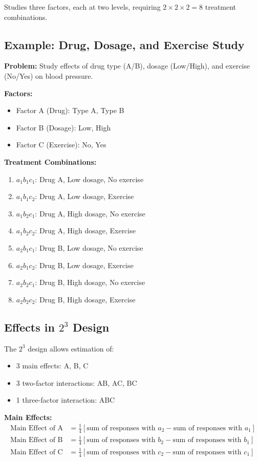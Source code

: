 \documentclass[twoside]{book}
\begin{document}
Studies three factors, each at two levels, requiring $2 \times 2 \times 2 = 8$ treatment combinations.

\subsection{Example: Drug, Dosage, and Exercise Study}

\textbf{Problem:} Study effects of drug type (A/B), dosage (Low/High), and exercise (No/Yes) on blood pressure.

\textbf{Factors:}
\begin{itemize}
    \item Factor A (Drug): Type A, Type B
    \item Factor B (Dosage): Low, High
    \item Factor C (Exercise): No, Yes
\end{itemize}

\textbf{Treatment Combinations:}
\begin{enumerate}
    \item $a_1b_1c_1$: Drug A, Low dosage, No exercise
    \item $a_1b_1c_2$: Drug A, Low dosage, Exercise
    \item $a_1b_2c_1$: Drug A, High dosage, No exercise
    \item $a_1b_2c_2$: Drug A, High dosage, Exercise
    \item $a_2b_1c_1$: Drug B, Low dosage, No exercise
    \item $a_2b_1c_2$: Drug B, Low dosage, Exercise
    \item $a_2b_2c_1$: Drug B, High dosage, No exercise
    \item $a_2b_2c_2$: Drug B, High dosage, Exercise
\end{enumerate}

\subsection{Effects in $2^3$ Design}

The $2^3$ design allows estimation of:
\begin{itemize}
    \item 3 main effects: A, B, C
    \item 3 two-factor interactions: AB, AC, BC
    \item 1 three-factor interaction: ABC
\end{itemize}

\textbf{Main Effects:}
\begin{align}
\text{Main Effect of A} &= \frac{1}{4}[\text{sum of responses with } a_2 - \text{sum of responses with } a_1] \\
\text{Main Effect of B} &= \frac{1}{4}[\text{sum of responses with } b_2 - \text{sum of responses with } b_1] \\
\text{Main Effect of C} &= \frac{1}{4}[\text{sum of responses with } c_2 - \text{sum of responses with } c_1]
\end{align}
\end{document}
